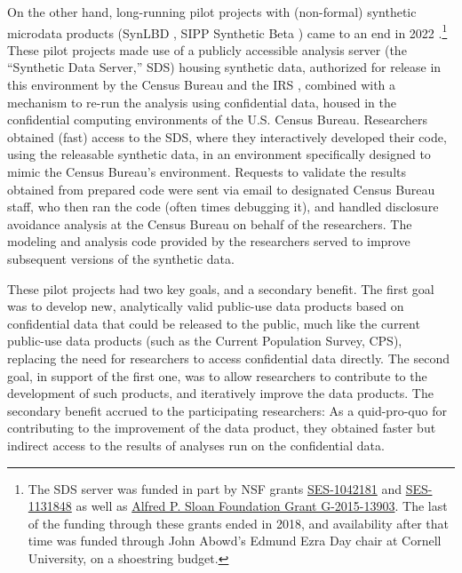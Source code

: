 \documentclass{article}
\begin{document}
On the other hand, long-running pilot projects with (non-formal) synthetic microdata products (SynLBD \citep{KinneyEtAl2011,us_census_bureau_synthetic_2011,vilhuber_codebook_2013}, SIPP Synthetic Beta \citep{Benedettoetal_2013,us_census_bureau_sipp_2015,reeder_codebook_2018}) came to an end in 2022 \citep{vilhuber_end_2022}.\footnote{The SDS server was funded in part by NSF grants \href{http://www.nsf.gov/awardsearch/showAward.do?AwardNumber=1042181}{SES-1042181} and \href{http://www.nsf.gov/awardsearch/showAward.do?AwardNumber=1131848}{SES-1131848} as well as \href{https://sloan.org/grant-detail/6845}{Alfred P. Sloan Foundation Grant G-2015-13903}. The last of the funding through these grants ended in 2018, and availability after that time was funded through John Abowd's Edmund Ezra Day chair at Cornell University, on a shoestring budget.} These pilot projects made use of a publicly accessible analysis server  (the ``Synthetic Data Server,'' SDS) housing synthetic data, authorized for release in this environment by the Census Bureau and the IRS \citep[e.g.][]{us_census_bureau_disclosure_2015}, combined with a mechanism to re-run the analysis using confidential data, housed in the confidential computing environments of the U.S. Census Bureau. Researchers obtained (fast) access to the SDS, where they interactively developed their code, using the releasable synthetic data, in an environment specifically designed to mimic the Census Bureau's environment. Requests to validate the results obtained from prepared code were sent via email to designated Census Bureau staff, who then ran the code (often times debugging it), and handled disclosure avoidance analysis at the Census Bureau on behalf of the researchers. The modeling and analysis code provided by the researchers served to improve subsequent versions of the synthetic data. 

These pilot projects had two key goals, and a secondary benefit. The first goal was to develop new, analytically valid public-use data products based on confidential data that could be released to the public, much like the current public-use data products (such as the Current Population Survey, CPS), replacing the need for researchers to access confidential data directly. The second goal, in support of the first one, was to allow researchers to contribute to the development of such products, and iteratively improve the data products. The secondary benefit accrued to the participating researchers: As a quid-pro-quo for contributing to the improvement of the data product, they obtained faster but indirect access to the results of analyses run on the confidential data. 
\end{document}
